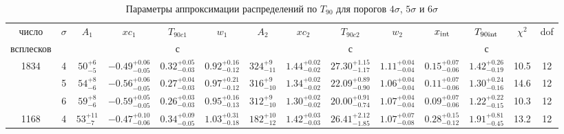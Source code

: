 
%

\begin{table} [h]
 \centering
 \caption{Параметры аппроксимации распределений по $T_{90}$ для порогов 
          $4\sigma$, $5\sigma$ и $6\sigma$}\label{tab:T90_distr}
\scriptsize
  \begin{center}
  \begin{tabular}{c c c c c c c c c c c c c c} %
  \hline
  \hline
число & $\sigma$ & $A_1$ & $xc_1$ & $T_{90c1}$ & $w_1$ & 
                 $A_2$ & $xc_2$ & $T_{90c2}$ & $w_2$ & 
				 $x_{{\mathrm{int}}}$ & $T_{90{\mathrm{int}}}$ & $\chi^2$ & dof \\
всплесков & & & & с & & & & с & & &  с & & \\
  \hline
1834 & 4 & $     50 ^{+     6}_{-     5}$ & $  -0.49 ^{+  0.06}_{-  0.05}$ & $   0.32 ^{+  0.05}_{-  0.03}$ & $   0.92 ^{+  0.16}_{-  0.12}$ & $    324 ^{+     9}_{-    11}$ & $   1.44 ^{+  0.02}_{-  0.02}$ & $  27.30 ^{+  1.15}_{-  1.17}$ & $   1.11 ^{+  0.04}_{-  0.04}$ & $   0.15 ^{+  0.07}_{-  0.06}$ & $  1.42 ^{+ 0.26}_{- 0.19}$ &   10.5 & 12 \\ 
& 5 & $     54 ^{+     8}_{-     6}$ & $  -0.56 ^{+  0.06}_{-  0.05}$ & $   0.27 ^{+  0.04}_{-  0.03}$ & $   0.97 ^{+  0.21}_{-  0.12}$ & $    316 ^{+     9}_{-    10}$ & $   1.34 ^{+  0.02}_{-  0.02}$ & $  22.09 ^{+  0.89}_{-  0.90}$ & $   1.06 ^{+  0.04}_{-  0.04}$ & $   0.11 ^{+  0.07}_{-  0.06}$ & $  1.30 ^{+ 0.24}_{- 0.16}$ &   14.6 & 12 \\ 
& 6 & $     59 ^{+     8}_{-     6}$ & $  -0.59 ^{+  0.05}_{-  0.05}$ & $   0.26 ^{+  0.03}_{-  0.03}$ & $   0.95 ^{+  0.16}_{-  0.13}$ & $    312 ^{+     9}_{-    10}$ & $   1.30 ^{+  0.02}_{-  0.02}$ & $  20.00 ^{+  0.91}_{-  0.74}$ & $   1.07 ^{+  0.04}_{-  0.04}$ & $   0.09 ^{+  0.07}_{-  0.06}$ & $  1.22 ^{+ 0.22}_{- 0.15}$ &   10.3 & 12 \\ 
1168& 4 & $     53 ^{+    11}_{-     7}$ & $  -0.47 ^{+  0.10}_{-  0.06}$ & $   0.34 ^{+  0.09}_{-  0.05}$ & $   1.03 ^{+  0.31}_{-  0.18}$ & $    182 ^{+    10}_{-    12}$ & $   1.42 ^{+  0.03}_{-  0.03}$ & $  26.41 ^{+  2.12}_{-  1.85}$ & $   1.07 ^{+  0.07}_{-  0.08}$ & $   0.28 ^{+  0.15}_{-  0.12}$ & $  1.91 ^{+ 0.81}_{- 0.45}$ &   13.2 & 12 \\ 

\end{tabular}
\end{center}
\end{table}
